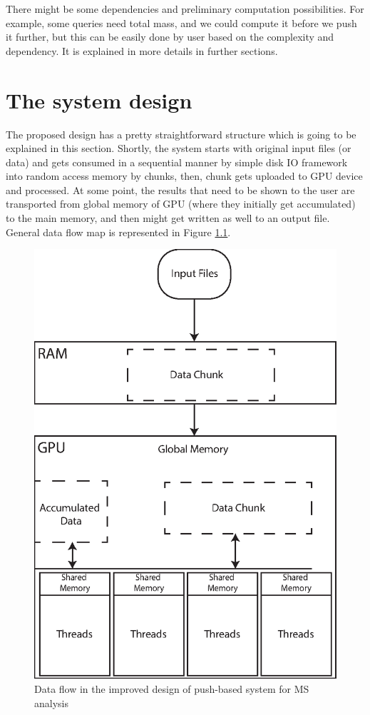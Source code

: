 \documentclass[12pt,letterpaper]{report}
\begin{document}
There might be some dependencies and preliminary computation possibilities. For example, some queries need total mass, and we could compute it before we push it further, but this can be easily done by user based on the complexity and dependency. It is explained in more details in further sections.


\vspace{3mm}
\chapter{The system design}\label{sc:system}
\vspace{3mm}

\hspace{3em} The proposed design has a pretty straightforward structure which is going to be explained in this section. Shortly, the system starts with original input files (or data) and gets consumed in a sequential manner by simple disk IO framework into random access memory by chunks, then, chunk gets uploaded to GPU device and processed. At some point, the results that need to be shown to the user are transported from global memory of GPU (where they initially get accumulated) to the main memory, and then might get written as well to an output file. General data flow map is represented in Figure  \ref{fg:data-flow}.

\begin{figure}
 \centerline{ \includegraphics[width=0.65\columnwidth]{images/memory-organization.eps} }
 \caption{Data flow in the improved design of push-based system for MS analysis}
 \label{fg:data-flow}
\end{figure}
\end{document}
